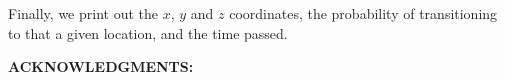 \documentclass[aps,prb,preprint,superscriptaddress]{revtex4-1}
\begin{document}
Finally, we print out the $x$, $y$ and $z$ coordinates, the probability of transitioning to that a given location, and the time passed.
\clearpage

\bigskip

{\bf ACKNOWLEDGMENTS:}






\end{document}
